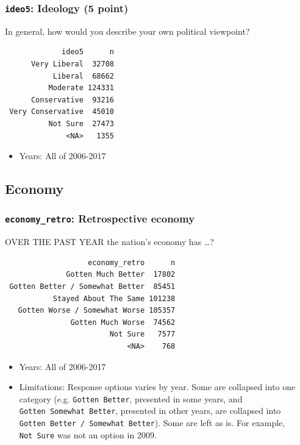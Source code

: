 \documentclass[10pt,article,oneside]{memoir}
\theoremstyle{definition}
\begin{document}
\hypertarget{ideo5-ideology-5-point}{%
\subsubsection{\texorpdfstring{\texttt{ideo5}: Ideology (5
point)}{ideo5: Ideology (5 point)}}\label{ideo5-ideology-5-point}}

In general, how would you describe your own political viewpoint?

\begin{verbatim}
             ideo5      n
      Very Liberal  32708
           Liberal  68662
          Moderate 124331
      Conservative  93216
 Very Conservative  45010
          Not Sure  27473
              <NA>   1355
\end{verbatim}

\begin{itemize}
\tightlist
\item
  Years: All of 2006-2017
\end{itemize}

\hypertarget{economy}{%
\subsection{Economy}\label{economy}}

\hypertarget{economy_retro-retrospective-economy}{%
\subsubsection{\texorpdfstring{\texttt{economy\_retro}: Retrospective
economy}{economy\_retro: Retrospective economy}}\label{economy_retro-retrospective-economy}}

OVER THE PAST YEAR the nation's economy has \ldots{}?

\begin{verbatim}
                   economy_retro      n
              Gotten Much Better  17802
 Gotten Better / Somewhat Better  85451
           Stayed About The Same 101238
   Gotten Worse / Somewhat Worse 105357
               Gotten Much Worse  74562
                        Not Sure   7577
                            <NA>    768
\end{verbatim}

\begin{itemize}
\tightlist
\item
  Years: All of 2006-2017
\item
  Limitations: Response options varies by year. Some are collapsed into
  one category (e.g. \texttt{Gotten\ Better}, presented in some years,
  and \texttt{Gotten\ Somewhat\ Better}, presented in other years, are
  collapsed into \texttt{Gotten\ Better\ /\ Somewhat\ Better}). Some are
  left as is. For example, \texttt{Not\ Sure} was not an option in 2009.
\end{itemize}
\end{document}
